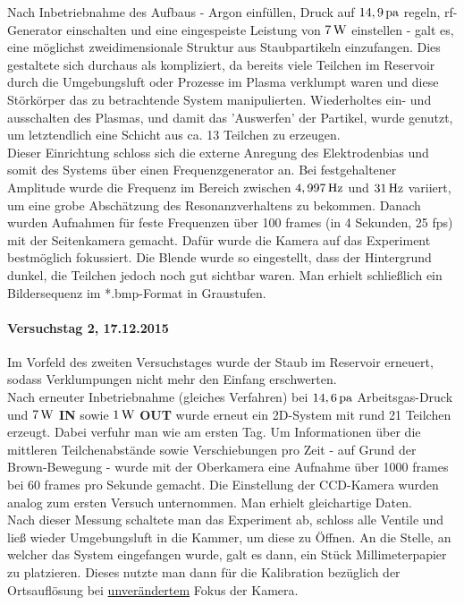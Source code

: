 \documentclass[numbers=noenddot,a4paper,notitlepage,twoside,BCOR15mm]{scrartcl}
\newcommand{\fett}[1]{\textbf{#1}}
\begin{document}
			Nach Inbetriebnahme des Aufbaus - Argon einfüllen, Druck auf $\unit[14,9]{pa}$ regeln, rf-Generator einschalten und eine eingespeiste Leistung von $\unit[7]{W}$ einstellen - galt es, eine möglichst zweidimensionale Struktur aus Staubpartikeln einzufangen. Dies gestaltete sich durchaus als kompliziert, da bereits viele Teilchen im Reservoir durch die Umgebungsluft oder Prozesse im Plasma verklumpt waren und diese Störkörper das zu betrachtende System manipulierten. Wiederholtes ein- und ausschalten des Plasmas, und damit das 'Auswerfen' der Partikel, wurde genutzt, um letztendlich eine Schicht aus ca. 13 Teilchen zu erzeugen.\\
			Dieser Einrichtung schloss sich die externe Anregung des Elektrodenbias und somit des Systems über einen Frequenzgenerator an. Bei festgehaltener Amplitude wurde die Frequenz im Bereich zwischen $\unit[4,997]{Hz}$ und $\unit[31]{Hz}$ variiert, um eine grobe Abschätzung des Resonanzverhaltens zu bekommen. Danach wurden Aufnahmen für feste Frequenzen über 100 frames (in 4 Sekunden, 25 fps) mit der Seitenkamera gemacht. Dafür wurde die Kamera auf das Experiment bestmöglich fokussiert. Die Blende wurde so eingestellt, dass der Hintergrund dunkel, die Teilchen jedoch noch gut sichtbar waren. Man erhielt schließlich ein Bildersequenz im *.bmp-Format in Graustufen.

		\paragraph{Versuchstag 2, 17.12.2015}

			Im Vorfeld des zweiten Versuchstages wurde der Staub im Reservoir erneuert, sodass Verklumpungen nicht mehr den Einfang erschwerten.\\
			Nach erneuter Inbetriebnahme (gleiches Verfahren) bei $\unit[14,6]{pa}$ Arbeitsgas-Druck und $\unit[7]{W}$ \fett{IN} sowie $\unit[1]{W}$ \fett{OUT} wurde erneut ein 2D-System mit rund 21 Teilchen erzeugt. Dabei verfuhr man wie am ersten Tag. Um Informationen über die mittleren Teilchenabstände sowie Verschiebungen pro Zeit - auf Grund der Brown-Bewegung - wurde mit der Oberkamera eine Aufnahme über 1000 frames bei 60 frames pro Sekunde gemacht. Die Einstellung der CCD-Kamera wurden analog zum ersten Versuch unternommen. Man erhielt gleichartige Daten.\\
			Nach dieser Messung schaltete man das Experiment ab, schloss alle Ventile und ließ wieder Umgebungsluft in die Kammer, um diese zu Öffnen. An die Stelle, an welcher das System eingefangen wurde, galt es dann, ein Stück Millimeterpapier zu platzieren. Dieses nutzte man dann für die Kalibration bezüglich der Ortsauflösung bei \underline{unverändertem} Fokus der Kamera.
\end{document}
